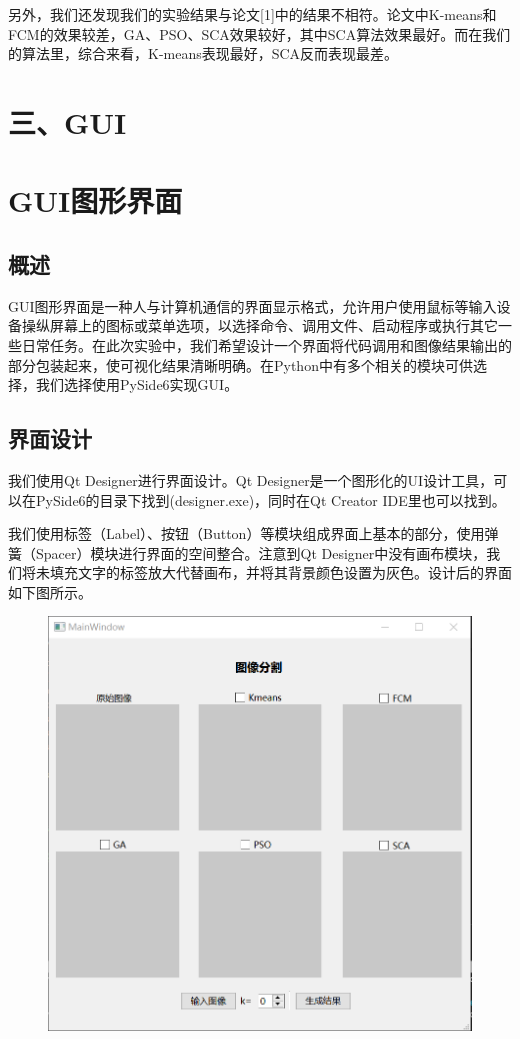 \documentclass{article}
\begin{document}
另外，我们还发现我们的实验结果与论文[1]中的结果不相符。论文中K-means和FCM的效果较差，GA、PSO、SCA效果较好，其中SCA算法效果最好。而在我们的算法里，综合来看，K-means表现最好，SCA反而表现最差。

\section*{三、GUI}
\section{GUI图形界面}
\subsection{概述}

GUI图形界面是一种人与计算机通信的界面显示格式，允许用户使用鼠标等输入设备操纵屏幕上的图标或菜单选项，以选择命令、调用文件、启动程序或执行其它一些日常任务。在此次实验中，我们希望设计一个界面将代码调用和图像结果输出的部分包装起来，使可视化结果清晰明确。在Python中有多个相关的模块可供选择，我们选择使用PySide6实现GUI。

\subsection{界面设计}

我们使用Qt Designer进行界面设计。Qt Designer是一个图形化的UI设计工具，可以在PySide6的目录下找到(designer.exe)，同时在Qt Creator IDE里也可以找到。

我们使用标签（Label）、按钮（Button）等模块组成界面上基本的部分，使用弹簧（Spacer）模块进行界面的空间整合。注意到Qt Designer中没有画布模块，我们将未填充文字的标签放大代替画布，并将其背景颜色设置为灰色。设计后的界面如下图所示。

\begin{figure}[H]  
	\centering
	\includegraphics[scale=0.5]{GUi界面.png}
\end{figure}
\end{document}
